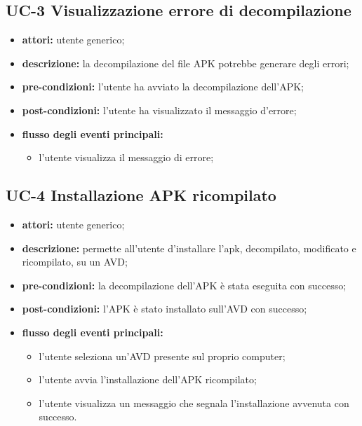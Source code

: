 \subsection*{UC-3 Visualizzazione errore di decompilazione}\label{subsec:uc-3-visualizzazione-errore-di-decompilazione}
\begin{itemize}
    \item \textbf{attori:} utente generico;
    \item \textbf{descrizione:} la decompilazione del file APK potrebbe generare degli errori;
    \item \textbf{pre-condizioni:} l'utente ha avviato la decompilazione dell'APK;
    \item \textbf{post-condizioni:} l'utente ha visualizzato il messaggio d'errore;
    \item \textbf{flusso degli eventi principali:}
    \begin{itemize}
        \item l'utente visualizza il messaggio di errore;
    \end{itemize}
\end{itemize}
\subsection*{UC-4 Installazione APK ricompilato}\label{subsec:uc-4-installazione-apk-decompilato}
\begin{itemize}
    \item \textbf{attori:} utente generico;
    \item \textbf{descrizione:} permette all'utente d'installare l'apk, decompilato, modificato e ricompilato, su un AVD;
    \item \textbf{pre-condizioni:} la decompilazione dell'APK è stata eseguita con successo;
    \item \textbf{post-condizioni:} l'APK è stato installato sull'AVD con successo;
    \item \textbf{flusso degli eventi principali:}
    \begin{itemize}
        \item l'utente seleziona un'AVD presente sul proprio computer;
        \item l'utente avvia l'installazione dell'APK ricompilato;
        \item l'utente visualizza un messaggio che segnala l'installazione avvenuta con successo.
    \end{itemize}
\end{itemize}
